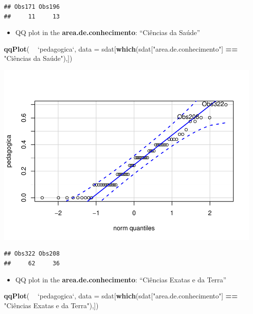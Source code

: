 \documentclass[]{article}
\newenvironment{Shaded}{\begin{snugshade}}{\end{snugshade}}
\newcommand{\DataTypeTok}[1]{\textcolor[rgb]{0.13,0.29,0.53}{#1}}
\newcommand{\KeywordTok}[1]{\textcolor[rgb]{0.13,0.29,0.53}{\textbf{#1}}}
\newcommand{\NormalTok}[1]{#1}
\newcommand{\OperatorTok}[1]{\textcolor[rgb]{0.81,0.36,0.00}{\textbf{#1}}}
\newcommand{\StringTok}[1]{\textcolor[rgb]{0.31,0.60,0.02}{#1}}
\providecommand{\tightlist}{%
  \setlength{\itemsep}{0pt}\setlength{\parskip}{0pt}}
\begin{document}
\begin{verbatim}
## Obs171 Obs196 
##     11     13
\end{verbatim}

\begin{itemize}
\tightlist
\item
  QQ plot in the \textbf{area.de.conhecimento}: ``Ciências da Saúde''
\end{itemize}

\begin{Shaded}
\begin{Highlighting}[]
\KeywordTok{qqPlot}\NormalTok{( }\OperatorTok{~}\StringTok{ `}\DataTypeTok{pedagogica}\StringTok{`}\NormalTok{, }\DataTypeTok{data =}\NormalTok{ sdat[}\KeywordTok{which}\NormalTok{(sdat[}\StringTok{"area.de.conhecimento"}\NormalTok{] }\OperatorTok{==}\StringTok{ "Ciências da Saúde"),])}
\end{Highlighting}
\end{Shaded}

\includegraphics{factorialAnova_files/figure-latex/unnamed-chunk-27-1.pdf}

\begin{verbatim}
## Obs322 Obs208 
##     62     36
\end{verbatim}

\begin{itemize}
\tightlist
\item
  QQ plot in the \textbf{area.de.conhecimento}: ``Ciências Exatas e da
  Terra''
\end{itemize}

\begin{Shaded}
\begin{Highlighting}[]
\KeywordTok{qqPlot}\NormalTok{( }\OperatorTok{~}\StringTok{ `}\DataTypeTok{pedagogica}\StringTok{`}\NormalTok{, }\DataTypeTok{data =}\NormalTok{ sdat[}\KeywordTok{which}\NormalTok{(sdat[}\StringTok{"area.de.conhecimento"}\NormalTok{] }\OperatorTok{==}\StringTok{ "Ciências Exatas e da Terra"}\NormalTok{),])}
\end{Highlighting}
\end{Shaded}
\end{document}
